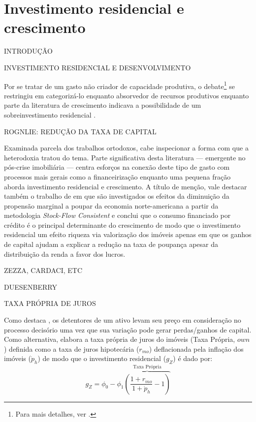 \section{Investimento residencial e crescimento}


INTRODUÇÃO

INVESTIMENTO RESIDENCIAL E DESENVOLVIMENTO

Por se tratar de um gasto não criador de capacidade produtiva, o debate\footnote{Para mais detalhes, ver \textcite{arku_housing_2006}.} se restringiu em categorizá-lo enquanto absorvedor de recursos produtivos \cite{solow_importance_1995} enquanto parte da literatura de crescimento indicava  a possibilidade de um sobreinvestimento residencial \cite{mills_has_1987}.

ROGNLIE: REDUÇÃO DA TAXA DE CAPITAL

Examinada parcela dos trabalhos ortodoxos, cabe inspecionar a forma com que a heterodoxia tratou do tema. 
Parte significativa desta literatura  --- emergente no pós-crise imobiliária --- centra esforços na conexão deste tipo de gasto com processos mais gerais como a financeirização \cites{aalbers_financialization_2008}{bibow_financialization_2010} enquanto uma pequena fração aborda investimento residencial e crescimento.
A título de menção, vale destacar também o trabalho de \textcite{zezza_u.s._2008} em que são investigados os efeitos da diminuição da propensão marginal a poupar da economia norte-americana a partir da metodologia \textit{Stock-Flow Consistent} e conclui que o consumo financiado por crédito é o principal determinante do crescimento de modo que o investimento residencial um efeito riqueza via valorização dos imóveis apenas em que os ganhos de capital ajudam a explicar a redução na taxa de poupança apesar da distribuição da renda a favor dos lucros. 


ZEZZA, CARDACI, ETC


DUESENBERRY

TAXA PRÓPRIA DE JUROS

Como destaca \textcite[p.~53]{teixeira_crescimento_2015}, os detentores de um ativo levam seu preço em consideração no processo decisório uma vez que sua variação pode gerar perdas/ganhos de capital. Como alternativa, elabora a taxa própria de juros do imóveis (Taxa Própria, $own$) definida como a taxa de juros hipotecária ($r_{mo}$) deflacionada pela inflação dos imóveis ({$\dot p_h$}) de modo que o investimento residencial ($g_Z$) é dado por:
$$
g_Z = \phi_0 - \phi_1 \overbrace{\left(\frac{1+r_{mo}}{1+\dot p_h} - 1\right)}^{\text{Taxa Própria}}
$$

